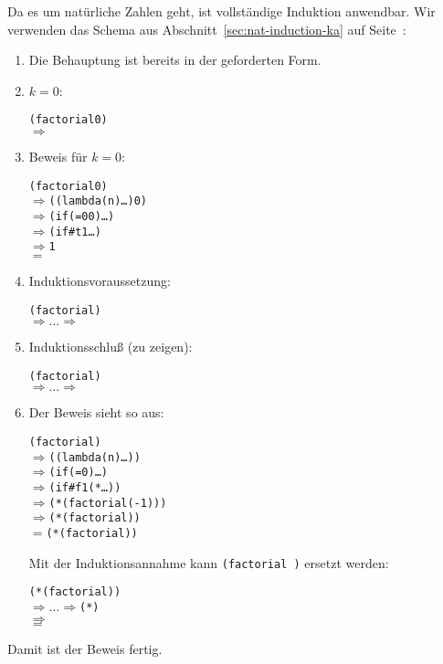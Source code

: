 Da es um natürliche Zahlen geht, ist vollständige Induktion
anwendbar.  Wir verwenden das Schema aus
Abschnitt~\ref{sec:nat-induction-ka} auf
Seite~\pageref{sec:nat-induction-ka}:
%
\begin{enumerate}
\item Die Behauptung ist bereits in der geforderten Form.
\item $k = 0$:
\begin{alltt}
(factorial 0)
\(\Longrightarrow\) 
\end{alltt}
%
\item Beweis für $k=0$:
\begin{alltt}
(factorial 0)
\(\Longrightarrow\) ((lambda (n) \ldots) 0)
\(\Longrightarrow\) (if (= 0 0) \ldots)
\(\Longrightarrow\) (if #t 1 \ldots)
\(\Longrightarrow\) 1
\(=\) 
\end{alltt}
%
\item Induktionsvoraussetzung:

\begin{alltt}
(factorial )
\(\Longrightarrow\ldots\Longrightarrow\) 
\end{alltt}

\item Induktionsschluß (zu zeigen):

\begin{alltt}
(factorial )
\(\Longrightarrow\ldots\Longrightarrow\) 
\end{alltt}
\item 

Der Beweis sieht so aus:
%
\begin{alltt}
(factorial )
\(\Longrightarrow\) ((lambda (n) \ldots) )
\(\Longrightarrow\) (if (=  0) \ldots)
\(\Longrightarrow\) (if #f 1 (* \ldots))
\(\Longrightarrow\) (*  (factorial (-  1)))
\(\Longrightarrow\) (*  (factorial ))
\(=\) (*  (factorial ))
\end{alltt}
%
Mit der Induktionsannahme kann \texttt{(factorial )} ersetzt werden:
%
\begin{alltt}
(*  (factorial ))
\(\Longrightarrow\ldots\Longrightarrow\) (*  )
\(\Longrightarrow\) 
\(=\) 
\end{alltt}
%
\end{enumerate}

Damit ist der Beweis fertig.

